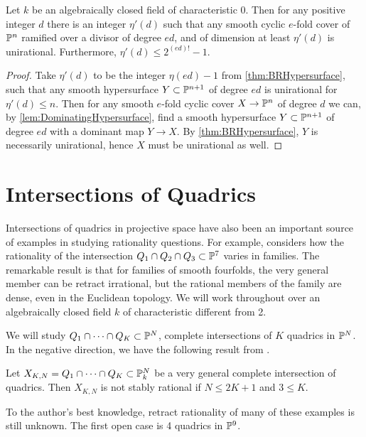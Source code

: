 	\begin{theorem}
          \label{thm:SmoothDoubleCoverUnirationality}
		Let $k$ be an algebraically closed field of characteristic 0. Then for any positive integer $d$ there is an integer $\eta'(d)$ such that any smooth cyclic $e$-fold cover of $\P^n$ ramified over a divisor of degree $ed$, and of dimension at least $\eta'(d)$ is unirational. Furthermore, $\eta'(d) \leq 2^{(ed)!}-1$.
	\end{theorem}
	\begin{proof}
		Take $\eta'(d)$ to be the integer $\eta(ed)-1$ from \cref{thm:BRHypersurface}, such that any smooth hypersurface $Y \subset \P^{n+1}$ of degree $ed$ is unirational for $\eta'(d) \leq n$. Then for any smooth $e$-fold cyclic cover $X \to \P^n$ of degree $d$ we can, by \cref{lem:DominatingHypersurface}, find a smooth hypersurface $Y \subset \P^{n+1}$ of degree $ed$ with a dominant map $Y \to X$. By \cref{thm:BRHypersurface}, $Y$ is necessarily unirational, hence $X$ must be unirational as well.
	\end{proof}

\section{Intersections of Quadrics}
Intersections of quadrics in projective space have also been an important source of examples in studying rationality questions. For example, \cite{HPTThreeQuadrics} considers how the rationality of the intersection $Q_1 \cap Q_2 \cap Q_3 \subset \P^7$ varies in families. The remarkable result is that for families of smooth fourfolds, the very general member can be retract irrational, but the rational members of the family are dense, even in the Euclidean topology. We will work throughout over an algebraically closed field $k$ of characteristic different from 2.

We will study $Q_1 \cap \cdots \cap Q_K \subset \P^N$, complete intersections of $K$ quadrics in $\P^N$. In the negative direction, we have the following result from \cite[Theorem 7.8]{NicaiseOttem}.
\begin{theorem}
	\label{thm:QuadricsIrrationality}
  Let $X_{K,N} = Q_1 \cap \cdots \cap Q_K \subset \P_k^N$ be a very general complete intersection of quadrics. Then $X_{K,N}$ is not stably rational if $N \leq 2K+1$ and $3 \leq K$.
\end{theorem}
\begin{remark}
  To the author's best knowledge, retract rationality of many of these examples is still unknown. The first open case is 4 quadrics in $\P^9$.
\end{remark}

